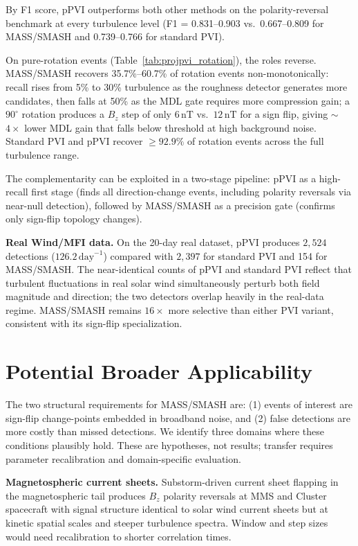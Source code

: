 \documentclass[12pt,letterpaper]{article}
\newcommand{\nT}{\,\mathrm{nT}}
\newcommand{\pPVI}{\mathrm{pPVI}}
\begin{document}
By F1 score, $\pPVI$ outperforms both other methods on the polarity-reversal
benchmark at every turbulence level (F1 = 0.831--0.903 vs.\ 0.667--0.809 for
MASS/SMASH and 0.739--0.766 for standard PVI).

On pure-rotation events (Table~\ref{tab:projpvi_rotation}), the roles reverse.
MASS/SMASH recovers 35.7\%--60.7\% of rotation events non-monotonically:
recall rises from 5\% to 30\% turbulence as the roughness detector generates
more candidates, then falls at 50\% as the MDL gate requires more compression
gain; a $90^\circ$ rotation produces a $B_z$ step of only $6\nT$ vs.\
$12\nT$ for a sign flip, giving $\sim$$4\times$ lower MDL gain that falls
below threshold at high background noise.
Standard PVI and $\pPVI$ recover $\geq 92.9\%$ of rotation events across the
full turbulence range.

The complementarity can be exploited in a two-stage pipeline: $\pPVI$ as a
high-recall first stage (finds all direction-change events, including polarity
reversals via near-null detection), followed by MASS/SMASH as a precision
gate (confirms only sign-flip topology changes).

\textbf{Real Wind/MFI data.}
On the 20-day real dataset, $\pPVI$ produces $2{,}524$ detections
($126.2\,\mathrm{day}^{-1}$) compared with $2{,}397$ for standard PVI and
154 for MASS/SMASH.
The near-identical counts of $\pPVI$ and standard PVI reflect that turbulent
fluctuations in real solar wind simultaneously perturb both field magnitude
and direction; the two detectors overlap heavily in the real-data regime.
MASS/SMASH remains $16\times$ more selective than either PVI variant,
consistent with its sign-flip specialization.

\section{Potential Broader Applicability}
\label{sec:applications}

The two structural requirements for MASS/SMASH are: (1) events of interest are
sign-flip change-points embedded in broadband noise, and (2) false detections
are more costly than missed detections.
We identify three domains where these conditions plausibly hold.
These are hypotheses, not results; transfer requires parameter recalibration
and domain-specific evaluation.

\textbf{Magnetospheric current sheets.}
Substorm-driven current sheet flapping in the magnetospheric tail produces
$B_z$ polarity reversals at MMS and Cluster spacecraft
\citep{Chasapis2015,Retino2007} with signal structure identical to solar wind
current sheets but at kinetic spatial scales and steeper turbulence spectra.
Window and step sizes would need recalibration to shorter correlation times.
\end{document}
